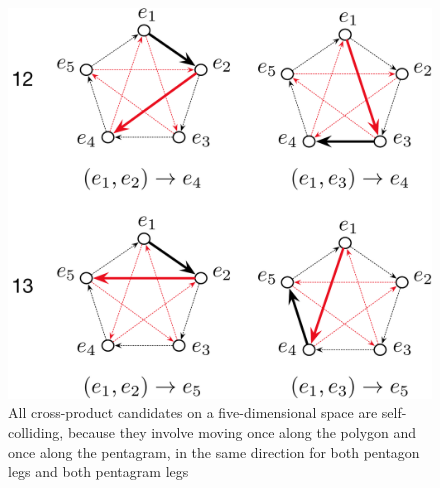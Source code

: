 \documentclass[11pt]{article}
\begin{document}
\begin{figure}[htbp]
\begin{center}
\includegraphics[width=.85\textwidth]{Collisions5D.pdf}
\caption{All cross-product candidates on a five-dimensional space are self-colliding, because they involve moving once along the polygon and once along the pentagram, in the same direction for both pentagon legs and both pentagram legs}
\label{fig:5collision}
\end{center}
\end{figure}
\end{document}
